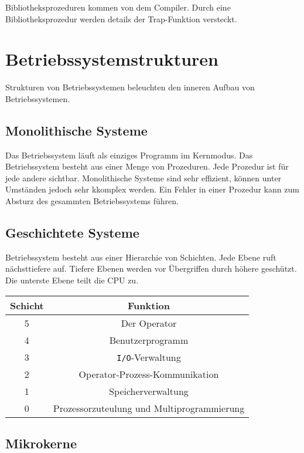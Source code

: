Bibliotheksprozeduren kommen von dem Compiler. Durch eine Bibliotheksprozedur
werden details der Trap-Funktion versteckt.

\section{Betriebssystemstrukturen}

Strukturen von Betriebssystemen beleuchten den inneren Aufbau von
Betriebssystemen.

\subsection{Monolithische Systeme}

Das Betriebssystem läuft als einziges Programm im Kernmodus. Das Betriebssystem
besteht aus einer Menge von Prozeduren. Jede Prozedur ist für jede andere
sichtbar. Monolithische Systeme sind sehr effizient, können unter Umständen
jedoch sehr kkomplex werden. Ein Fehler in einer Prozedur kann zum Absturz des
gesammten Betriebssystems führen.

\subsection{Geschichtete Systeme}

Betriebssystem besteht aus einer Hierarchie von Schichten. Jede Ebene ruft
nächsttiefere auf. Tiefere Ebenen werden vor Übergriffen durch höhere
geschützt. Die unterste Ebene teilt die CPU zu.

\begin{tabular}{ | c | c | }
    \hline
    Schicht & Funktion                                   \\\hline
    5       & Der Operator                               \\
    4       & Benutzerprogramm                           \\
    3       & \texttt{I/O}-Verwaltung                    \\
    2       & Operator-Prozess-Kommunikation             \\
    1       & Speicherverwaltung                         \\
    0       & Prozessorzuteulung und Multiprogrammierung \\\hline
\end{tabular}

\subsection{Mikrokerne}

